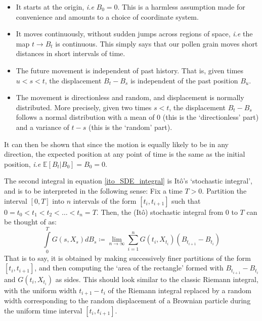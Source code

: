 \begin{itemize}
	\item It starts at the origin, \emph{i.e} $B_0 = 0$. This is a harmless assumption made for convenience and amounts to a choice of coordinate system.
	\item It moves continuously, without sudden jumps across regions of space, \emph{i.e} the map $t \to B_t$ is continuous. This simply says that our pollen grain moves short distances in short intervals of time.
	\item The future movement is independent of past history. That is, given times $u < s < t$, the displacement $B_t - B_s$ is independent of the past position $B_u$.
	\item The movement is directionless and random, and displacement is normally distributed. More precisely, given two times $s < t$, the displacement $B_t - B_s$ follows a normal distribution with a mean of $0$ (this is the `directionless' part) and a variance of $t-s$ (this is the `random' part).
\end{itemize}
It can then be shown that since the motion is equally likely to be in any direction, the expected position at any point of time is the same as the initial position, \emph{i.e} $\mathbb{E}[B_t | B_0] = B_0 = 0$.

The second integral in equation \eqref{ito_SDE_integral} is It\^o's `stochastic integral', and is to be interpreted in the following sense: Fix a time $T > 0$. Partition the interval $[0,T]$ into $n$ intervals of the form $[t_i,t_{i+1}]$ such that $0 = t_0 < t_1 < t_2 < \ldots < t_n = T$. Then, the (It\^o) stochastic integral from $0$ to $T$ can be thought of as:
\begin{equation*}
\int\limits_{0}^{T} G(s,X_s)dB_s \coloneqq \lim_{n \to \infty} \sum\limits_{i=1}^{n}G(t_i,X_{t_i})(B_{t_{i+1}}-B_{t_i})  
\end{equation*}
That is to say, it is obtained by making successively finer partitions of the form $[t_i,t_{i+1}]$, and then computing the `area of the rectangle' formed with $B_{t_{i+1}}-B_{t_i}$ and $G(t_i,X_{t_i})$ as sides. This should look similar to the classic Riemann integral, with the uniform width $t_{i+1}-t_i$ of the Riemann integral replaced by a random width corresponding to the random displacement of a Brownian particle during the uniform time interval $[t_i,t_{i+1}]$.

